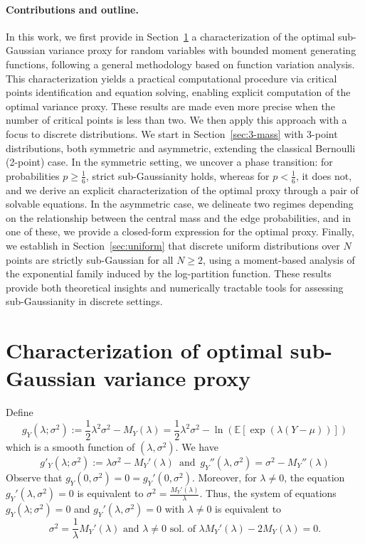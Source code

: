 \documentclass[a4paper, 10pt]{article}
\newcommand{\beq}{\begin{equation}}
\newcommand{\eeq}{\end{equation}}
\theoremstyle{definition}
\begin{document}
\paragraph{Contributions and outline.}
In this work, we first provide in Section~\ref{sec:charac} a characterization of the optimal sub-Gaussian variance proxy for random variables with bounded moment generating functions, following a general methodology based on function variation analysis. This characterization yields a practical computational procedure via critical points identification and equation solving, enabling explicit computation of the optimal variance proxy. These results are made even more precise when the number of critical points is less than two. We then apply this approach with a focus to discrete distributions. We start in Section~\ref{sec:3-mass} with 3-point distributions, both symmetric and asymmetric, extending the classical Bernoulli (2-point) case. In the symmetric setting, we uncover a phase transition: for probabilities $p \geq \frac{1}{6}$, strict sub-Gaussianity holds, whereas for $p < \frac{1}{6}$, it does not, and we derive an explicit characterization of the optimal proxy through a pair of solvable equations. In the asymmetric case, we delineate two regimes depending on the relationship between the central mass and the edge probabilities, and in one of these, we provide a closed-form expression for the optimal proxy. Finally, we establish in Section~\ref{sec:uniform} that discrete uniform distributions over $N$ points are strictly sub-Gaussian for all $N\geq 2$, using a moment-based analysis of the exponential family induced by the log-partition function. These results provide both theoretical insights and numerically tractable tools for assessing sub-Gaussianity in discrete settings.


\section{Characterization of optimal sub-Gaussian variance proxy}\label{sec:charac}

Define
\beq g_Y(\lambda;\sigma^2):=\frac{1}{2}\lambda^2\sigma^2- M_Y(\lambda)= \frac{1}{2}\lambda^2\sigma^2-\ln \left(\mathbb{E}[\exp(\lambda (Y - \mu))]\right)\eeq
which is a smooth function of $(\lambda,\sigma^2)$.
We have
\beq g'_Y(\lambda;\sigma^2):= \lambda\sigma^2- M_Y'(\lambda) \, \text{ and } \, g_Y''(\lambda,\sigma^2)=\sigma^2-M_Y''(\lambda)\eeq
Observe that $g_Y(0,\sigma^2)=0=g_Y'(0,\sigma^2)$. Moreover, for $\lambda\neq 0$, the equation $g_Y'(\lambda,\sigma^2)=0$ is equivalent to $\sigma^2=\frac{M_Y'(\lambda)}{\lambda} $. Thus, the system of equations $g_Y(\lambda;\sigma^2)=0$ and $g_Y'(\lambda,\sigma^2)=0$ with $\lambda\neq 0$ is equivalent to  
\beq \sigma^2=\frac{1}{\lambda} M_Y'(\lambda) \text{ and } \lambda\neq 0 \text{ sol. of  } \lambda M_Y'(\lambda)- 2M_Y(\lambda)=0.\eeq
\end{document}
